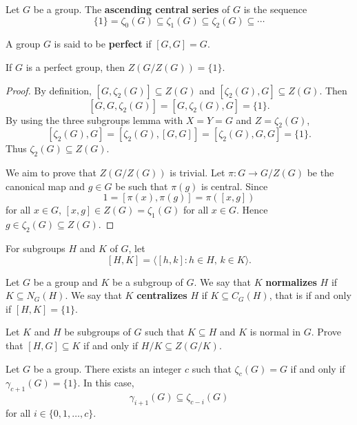 \begin{definition}
Let $G$ be a group. The \textbf{ascending central series} of $G$ 
is the sequence 
\[
\{1\}=\zeta_0(G)\subseteq\zeta_1(G)\subseteq\zeta_2(G)\subseteq\cdots
\]
\end{definition}

\begin{definition}
A group $G$ is said to be \textbf{perfect} if $[G,G]=G$.
\end{definition}

\begin{theorem}[Gr\"un]
\label{thm:Grun}
If $G$ is a perfect group, then $Z(G/Z(G))=\{1\}$. 
\end{theorem}

\begin{proof}
    By definition, $[G,\zeta_2(G)]\subseteq Z(G)$ and 
    $[\zeta_2(G),G]\subseteq Z(G)$. Then 
    \[
    [G,G,\zeta_2(G)]=[G,\zeta_2(G),G]=\{1\}.
    \]
    By using the three subgroups lemma with $X=Y=G$ and $Z=\zeta_2(G)$, 
    \[
    [\zeta_2(G),G]=[\zeta_2(G),[G,G]]=[\zeta_2(G),G,G]=\{1\}.
    \]
    Thus $\zeta_2(G)\subseteq Z(G)$. 
    
    We aim to prove that $Z(G/Z(G))$ is trivial. Let $\pi\colon G\to G/Z(G)$ be the canonical map and 
    $g\in G$ be such that $\pi(g)$ is central. Since 
    \[
    1=[\pi(x),\pi(g)]=\pi([x,g])
    \]
    for all $x\in G$, $[x,g]\in Z(G)=\zeta_1(G)$ for all $x\in G$. Hence 
    $g\in\zeta_2(G)\subseteq Z(G)$. 
\end{proof}

For subgroups $H$ and $K$ of $G$, let 
\[
[H,K]=\langle [h,k]:h\in H,\,k\in K\rangle.
\]

Let $G$ be a group and $K$ be a subgroup of $G$. We say that $K$ \textbf{normalizes} 
$H$ if $K\subseteq N_G(H)$.
We say that $K$ \textbf{centralizes} 
$H$ if $K\subseteq C_G(H)$, that is if and only if $[H,K]=\{1\}$.

\begin{exercise}
Let $K$ and $H$ be subgroups of $G$ such that $K\subseteq H$ and $K$ is normal in $G$.
Prove that $[H,G]\subseteq K$ if and only if $H/K\subseteq Z(G/K)$. 
\end{exercise}

\begin{lemma}
\label{lem:gamma_zeta}
Let $G$ be a group. There exists an integer $c$ such that 
$\zeta_c(G)=G$ if and only if 
$\gamma_{c+1}(G)=\{1\}$. In this case, 
\[
\gamma_{i+1}(G)\subseteq\zeta_{c-i}(G)
\]
for all $i\in\{0,1,\dots,c\}$. 
\end{lemma}


